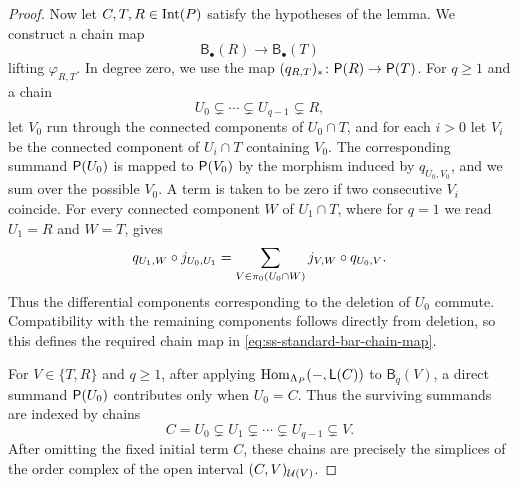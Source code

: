 \begin{proof}
Now let $C,T,R\in\operatorname{Int}(P)$ satisfy the hypotheses of the lemma. We
construct a chain map
\begin{equation}
\mathsf B_\bullet(R)\longrightarrow\mathsf B_\bullet(T)
\label{eq:ss-standard-bar-chain-map}
\end{equation}
lifting $\varphi_{R,T}$. In degree zero, we use the map
$(q_{R,T})_*\colon\mathsf P(R)\to\mathsf P(T)$. For $q\geq1$ and a chain
\[
U_0\subsetneq\cdots\subsetneq U_{q-1}\subsetneq R,
\]
let $V_0$ run through the connected components of $U_0\cap T$, and
for each $i>0$ let $V_i$ be the connected component of $U_i\cap T$
containing $V_0$.  The corresponding summand $\mathsf P(U_0)$ is mapped to
$\mathsf P(V_0)$ by the morphism induced by $q_{U_0,V_0}$, and we sum over
the possible $V_0$.  A term is taken to be zero if two consecutive
$V_i$ coincide.  
For every connected component $W$ of $U_1\cap T$, where for $q=1$ we read $U_1=R$ and $W=T$,
 gives
\begin{equation}
\label{eq:ss-standard-bar-chain-map-composition}
q_{U_1,W}\circ j_{U_0,U_1}
=
\sum_{V\in\pi_0(U_0\cap W)}
j_{V,W}\circ q_{U_0,V}.
\end{equation}
Thus the differential components corresponding to the deletion of
$U_0$ commute.  Compatibility with the remaining components follows
directly from deletion, so this defines the required chain map in \eqref{eq:ss-standard-bar-chain-map}.

For $V\in\{T,R\}$ and $q\geq1$, after applying
$\operatorname{Hom}_{\Lambda_P}(-,\mathsf L(C))$ to $\mathsf B_q(V)$, a direct
summand $\mathsf P(U_0)$ contributes only when $U_0=C$.
Thus the surviving
summands are indexed by chains
\[
C=U_0\subsetneq U_1\subsetneq\cdots\subsetneq U_{q-1}\subsetneq V.
\]
After omitting the fixed initial term $C$, these chains are precisely
the simplices of the order complex of the open interval
$(C,V)_{\mathcal U(V)}$.


\end{proof}
